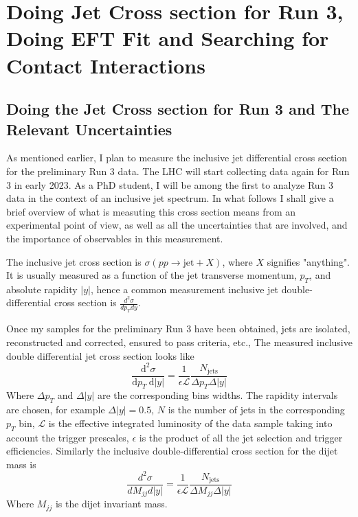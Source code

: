 \chapter{Doing Jet Cross section for Run 3, Doing EFT Fit and Searching for Contact Interactions}

\section{Doing the Jet Cross section for Run 3 and The Relevant Uncertainties}
As mentioned earlier, I plan to measure the inclusive jet differential cross section for the preliminary Run 3 data. The LHC will start collecting data again for Run 3 in early 2023. As a PhD student, I will be among the first to  analyze Run 3 data in the context of an inclusive jet spectrum. In what follows I shall give a brief overview of what is measuting this cross section means from an experimental point of view, as well as all the uncertainties that are involved, and the importance of observables in this measurement.


The inclusive jet cross section is $\sigma (pp \rightarrow \text{jet} + X)$, where $X$ signifies "anything". It is usually measured as a function of the jet transverse momentum, $p_T$,  and absolute rapidity $|y|$, hence a common measurement inclusive jet double-differential cross section is $\frac{d^2 \sigma}{dp_T dy}$.

Once my samples for the preliminary Run 3 have been obtained, jets are isolated, reconstructed and corrected, ensured to pass criteria, etc., The measured inclusive double differential jet cross section looks like
\begin{equation}
    \frac{\mathrm{d}^{2} \sigma}{\mathrm{d} p_{T} \mathrm{~d}|y|}=\frac{1}{\epsilon \mathcal{L}} \frac{N_{\text{jets}}}{\Delta p_{T} \Delta|y|}
\end{equation}
Where $\Delta p_T$ and $\Delta |y|$ are the corresponding bins widths. The rapidity intervals are chosen, for example $\Delta |y|=0.5$, $N$ is the number of jets in the corresponding $p_T$ bin, $\mathcal{L}$ is the effective integrated luminosity of the data sample taking into account the trigger prescales, $\epsilon$ is the product of all the jet selection and trigger efficiencies. Similarly the inclusive double-differential cross section for the dijet mass is
\begin{equation}
    \frac{d^{2} \sigma}{d M_{j j} d|y|}=\frac{1}{\epsilon \mathcal{L}} \frac{N_{\text{jets}}}{\Delta M_{j j} \Delta|y|}
\end{equation}
Where $M_{jj}$ is the dijet invariant mass.

